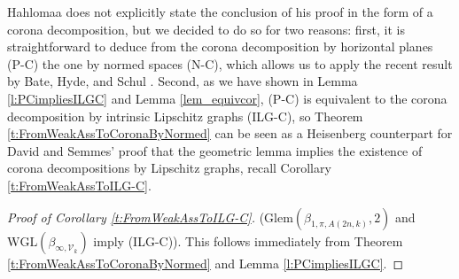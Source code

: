 \documentclass[12pt]{amsart}
\numberwithin{equation}{section}
\theoremstyle{plain}
\theoremstyle{definition}
\theoremstyle{remark}
\begin{document}
Hahlomaa does not explicitly state the conclusion of his proof in the form of a corona decomposition, but we decided to do so for two reasons: first, it is straightforward to deduce from the corona decomposition by horizontal planes (P-C) the one by normed spaces (N-C), which allows us to apply the recent result by Bate, Hyde, and Schul \cite{Bate}. Second, as we have shown in Lemma \ref{l:PCimpliesILGC} and Lemma \ref{lem_equivcor}, (P-C) is equivalent to the corona decomposition by intrinsic Lipschitz graphs (ILG-C), so Theorem \ref{t:FromWeakAssToCoronaByNormed} can be seen as a Heisenberg counterpart for David and Semmes' proof that the geometric lemma implies the  existence of corona decompositions by Lipschitz graphs, recall  Corollary \ref{t:FromWeakAssToILG-C}. 



\begin{proof}[Proof of Corollary  \ref{t:FromWeakAssToILG-C}] ($\mathrm{Glem}(\beta_{1,\pi, A(2n,k)}, 2)$ and $\mathrm{WGL}(\beta_{\infty,\mathcal V_k})$ imply (ILG-C)).
    This follows immediately from Theorem \ref{t:FromWeakAssToCoronaByNormed} and  Lemma \ref{l:PCimpliesILGC}. 
\end{proof}
\end{document}
